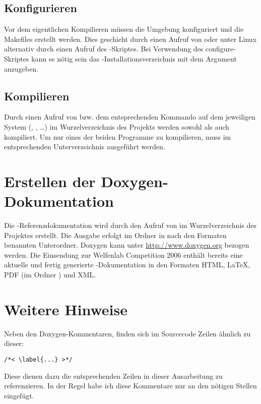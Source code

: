 \subsection{Konfigurieren}
Vor dem eigentlichen Kompilieren müssen die Umgebung konfiguriert und die Makefiles erstellt werden. Dies geschieht durch einen Aufruf von  oder unter Linux alternativ durch einen Aufruf des -Skriptes. Bei Verwendung des configure-Skriptes kann es nötig sein das -Installationsverzeichnis mit dem Argument  anzugeben.

\subsection{Kompilieren}
Durch einen Aufruf von  bzw. dem entsprechenden Kommando auf dem jeweiligen System (, , \dots) im Wurzelverzeichnis des Projekts werden sowohl  als auch  kompiliert. Um nur eines der beiden Programme zu kompilieren, muss  im entsprechenden Unterverzeichnis ausgeführt werden.

\section{Erstellen der Doxygen-Dokumentation} \label{sec:doxygen-doc}
Die -Referenzdokumentation wird durch den Aufruf von  im Wurzelverzeichnis des Projektes erstellt. Die Ausgabe erfolgt im Ordner  in nach den Formaten benannten Unterordner. Doxygen kann unter \url{http://www.doxygen.org} bezogen werden. Die Einsendung zur Welfenlab Competition 2006 enthält bereits eine aktuelle und fertig generierte -Dokumentation in den Formaten HTML, \LaTeX, PDF (im Ordner ) und XML.

\section{Weitere Hinweise}
Neben den Doxygen-Kommentaren, finden sich im Sourcecode Zeilen ähnlich zu dieser:
\begin{lstlisting}
/*< \label{...} >*/
\end{lstlisting}
Diese dienen dazu die entsprechenden Zeilen in dieser Ausarbeitung zu referenzieren. In der Regel habe ich diese Kommentare nur an den nötigen Stellen eingefügt.
